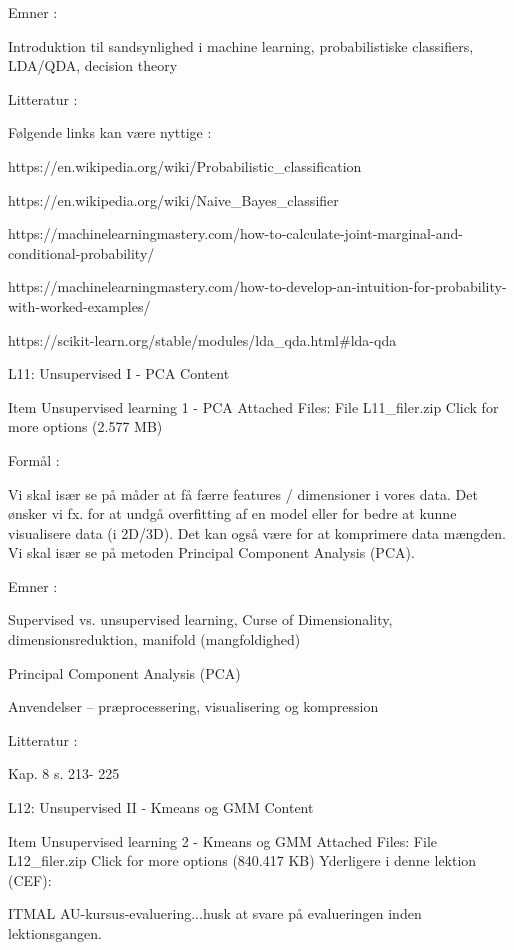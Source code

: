     Emner :

    Introduktion til sandsynlighed i machine learning, probabilistiske classifiers, LDA/QDA, decision theory


    Litteratur :

    Følgende links kan være nyttige :

    https://en.wikipedia.org/wiki/Probabilistic_classification

    https://en.wikipedia.org/wiki/Naive_Bayes_classifier

    https://machinelearningmastery.com/how-to-calculate-joint-marginal-and-conditional-probability/

    https://machinelearningmastery.com/how-to-develop-an-intuition-for-probability-with-worked-examples/

    https://scikit-learn.org/stable/modules/lda_qda.html#lda-qda






 L11: Unsupervised I - PCA
Content

    Item
    Unsupervised learning 1 - PCA
    Attached Files:
        File L11_filer.zip Click for more options (2.577 MB)

    Formål :

    Vi skal især se på måder at få færre features / dimensioner i vores data. Det ønsker vi fx. for at undgå overfitting af en model eller for bedre at kunne visualisere data (i 2D/3D). Det kan også være for at komprimere data mængden. Vi skal især se på metoden Principal Component Analysis (PCA).

    Emner :

    Supervised vs. unsupervised learning, Curse of Dimensionality, dimensionsreduktion, manifold (mangfoldighed)

    Principal Component Analysis (PCA)

    Anvendelser – præprocessering, visualisering og kompression


    Litteratur :

    Kap. 8  s. 213- 225


 L12: Unsupervised II - Kmeans og GMM
Content

    Item
    Unsupervised learning 2 - Kmeans og GMM
    Attached Files:
        File L12_filer.zip Click for more options (840.417 KB)
    Yderligere i denne lektion (CEF):

    ITMAL AU-kursus-evaluering...husk at svare på evalueringen inden lektionsgangen.


